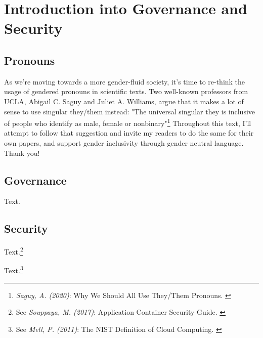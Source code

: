 %
%

\pagebreak
\section{Introduction into Governance and Security}

\onehalfspacing

\subsection{Pronouns}

As we're moving towards a more gender-fluid society, it's time to re-think the usage of gendered pronouns in scientific texts. Two well-known professors from UCLA, Abigail C. Saguy and Juliet A. Williams, argue that it makes a lot of sense to use singular they/them instead: "The universal singular they is inclusive of people who identify as male, female or nonbinary"\footnote{\textit{Saguy, A. (2020)}: Why We Should All Use They/Them Pronouns. \cite{pronouns}} Throughout this text, I'll attempt to follow that suggestion and invite my readers to do the same for their own papers, and support gender inclusivity through gender neutral language. Thank you!

\subsection{Governance}

Text.

\subsection{Security}

Text.\footnote{See \textit{Souppaya, M. (2017)}: Application Container Security Guide. \cite{sp800-190}}

Text.\footnote{See \textit{Mell, P. (2011)}: The NIST Definition of Cloud Computing. \cite{sp800-145}}
